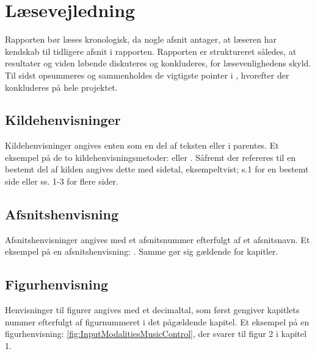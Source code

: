 \section*{Læsevejledning}
\label{Laesevejledning}
Rapporten bør læses kronologisk, da nogle afsnit antager, at læseren har kendskab til tidligere afsnit i rapporten.\blankline
%
Rapporten er struktureret således, at resultater og viden løbende diskuteres og konkluderes, for læsevenlighedens skyld. Til sidst opsummeres og sammenholdes de vigtigste pointer i , hvorefter der konkluderes på hele projektet.
%
\subsection*{Kildehenvisninger}
Kildehenvisninger angives enten som en del af teksten eller i parentes. Et eksempel på de to kildehenvisningsmetoder: \textcite[s. 3]{PDF:PIIntroduction} eller \parencite[s. 1]{PDF:PIIntroduction}. Såfremt der refereres til en bestemt del af kilden angives dette med sidetal, eksempeltvist; s.1 for en bestemt side eller ss. 1-3 for flere sider.
%
\subsection*{Afsnitshenvisning}
Afsnitshenvisninger angives med et afsnitsnummer efterfulgt af et afsnitsnavn. Et eksempel på en afsnitshenvisning: . Samme gør sig gældende for kapitler.
%
\subsection*{Figurhenvisning}
Henvisninger til figurer angives med et decimaltal, som først gengiver kapitlets nummer efterfulgt af figurnummeret i det pågældende kapitel. Et eksempel på en figurhenvisning: \autoref{fig:InputModalitiesMusicControl}, der svarer til figur 2 i kapitel 1. 
%
